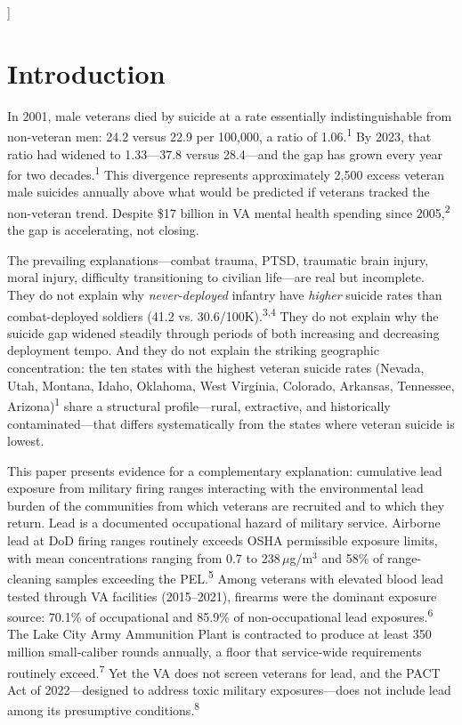 \documentclass[11pt,twocolumn]{article}
\begin{document}
\begin{@twocolumnfalse}
\begin{abstract}
\medskip
\noindent\textbf{Keywords:} veteran suicide, lead exposure, firing ranges, occupational health, neurotoxicity, PACT Act, convergent evidence
\end{abstract}
\vspace{1em}
\end{@twocolumnfalse}
]

\section{Introduction}

In 2001, male veterans died by suicide at a rate essentially indistinguishable from non-veteran men: 24.2 versus 22.9 per 100,000, a ratio of 1.06.\textsuperscript{1} By 2023, that ratio had widened to 1.33---37.8 versus 28.4---and the gap has grown every year for two decades.\textsuperscript{1} This divergence represents approximately 2,500 excess veteran male suicides annually above what would be predicted if veterans tracked the non-veteran trend. Despite \$17 billion in VA mental health spending since 2005,\textsuperscript{2} the gap is accelerating, not closing.

The prevailing explanations---combat trauma, PTSD, traumatic brain injury, moral injury, difficulty transitioning to civilian life---are real but incomplete. They do not explain why \textit{never-deployed} infantry have \textit{higher} suicide rates than combat-deployed soldiers (41.2 vs. 30.6/100K).\textsuperscript{3,4} They do not explain why the suicide gap widened steadily through periods of both increasing and decreasing deployment tempo. And they do not explain the striking geographic concentration: the ten states with the highest veteran suicide rates (Nevada, Utah, Montana, Idaho, Oklahoma, West Virginia, Colorado, Arkansas, Tennessee, Arizona)\textsuperscript{1} share a structural profile---rural, extractive, and historically contaminated---that differs systematically from the states where veteran suicide is lowest.

This paper presents evidence for a complementary explanation: cumulative lead exposure from military firing ranges interacting with the environmental lead burden of the communities from which veterans are recruited and to which they return. Lead is a documented occupational hazard of military service. Airborne lead at DoD firing ranges routinely exceeds OSHA permissible exposure limits, with mean concentrations ranging from 0.7 to 238\,$\mu$g/m$^3$ and 58\% of range-cleaning samples exceeding the PEL.\textsuperscript{5} Among veterans with elevated blood lead tested through VA facilities (2015--2021), firearms were the dominant exposure source: 70.1\% of occupational and 85.9\% of non-occupational lead exposures.\textsuperscript{6} The Lake City Army Ammunition Plant is contracted to produce at least 350 million small-caliber rounds annually, a floor that service-wide requirements routinely exceed.\textsuperscript{7} Yet the VA does not screen veterans for lead, and the PACT Act of 2022---designed to address toxic military exposures---does not include lead among its presumptive conditions.\textsuperscript{8}
\end{document}
